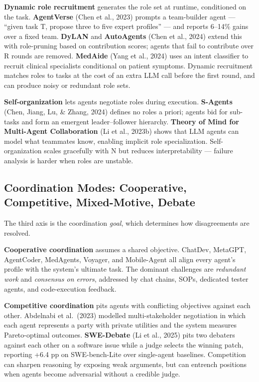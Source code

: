 \textbf{Dynamic role recruitment} generates the role set at runtime, conditioned on the task. \textbf{AgentVerse} (Chen et al., 2023) prompts a team-builder agent --- ``given task T, propose three to five expert profiles'' --- and reports 6--14\% gains over a fixed team. \textbf{DyLAN} and \textbf{AutoAgents} (Chen et al., 2024) extend this with role-pruning based on contribution scores; agents that fail to contribute over R rounds are removed. \textbf{MedAide} (Yang et al., 2024) uses an intent classifier to recruit clinical specialists conditional on patient symptoms. Dynamic recruitment matches roles to tasks at the cost of an extra LLM call before the first round, and can produce noisy or redundant role sets.

\textbf{Self-organization} lets agents negotiate roles during execution. \textbf{S-Agents} (Chen, Jiang, Lu, \& Zhang, 2024) defines no roles a priori; agents bid for sub-tasks and form an emergent leader--follower hierarchy. \textbf{Theory of Mind for Multi-Agent Collaboration} (Li et al., 2023b) shows that LLM agents can model what teammates know, enabling implicit role specialization. Self-organization scales gracefully with N but reduces interpretability --- failure analysis is harder when roles are unstable.

\subsection{Coordination Modes: Cooperative, Competitive, Mixed-Motive, Debate}\label{coordination-modes-cooperative-competitive-mixed-motive-debate}

The third axis is the coordination \emph{goal}, which determines how disagreements are resolved.

\textbf{Cooperative coordination} assumes a shared objective. ChatDev, MetaGPT, AgentCoder, MedAgents, Voyager, and Mobile-Agent all align every agent's profile with the system's ultimate task. The dominant challenges are \emph{redundant work} and \emph{consensus on errors}, addressed by chat chains, SOPs, dedicated tester agents, and code-execution feedback.

\textbf{Competitive coordination} pits agents with conflicting objectives against each other. Abdelnabi et al.~(2023) modelled multi-stakeholder negotiation in which each agent represents a party with private utilities and the system measures Pareto-optimal outcomes. \textbf{SWE-Debate} (Li et al., 2025) pits two debaters against each other on a software issue while a judge selects the winning patch, reporting +6.4 pp on SWE-bench-Lite over single-agent baselines. Competition can sharpen reasoning by exposing weak arguments, but can entrench positions when agents become adversarial without a credible judge.

